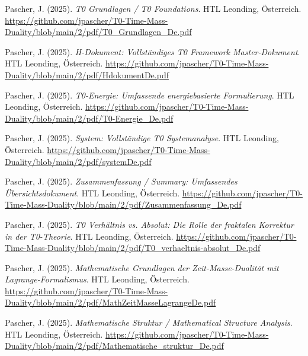\documentclass{article}
\begin{document}
	\begin{thebibliography}{99}
		
		
		Pascher, J. (2025).
		\textit{T0 Grundlagen / T0 Foundations}.
		HTL Leonding, Österreich.
		\url{https://github.com/jpascher/T0-Time-Mass-Duality/blob/main/2/pdf/T0_Grundlagen_De.pdf}
		
		Pascher, J. (2025).
		\textit{H-Dokument: Vollständiges T0 Framework Master-Dokument}.
		HTL Leonding, Österreich.
		\url{https://github.com/jpascher/T0-Time-Mass-Duality/blob/main/2/pdf/HdokumentDe.pdf}
		
		Pascher, J. (2025).
		\textit{T0-Energie: Umfassende energiebasierte Formulierung}.
		HTL Leonding, Österreich.
		\url{https://github.com/jpascher/T0-Time-Mass-Duality/blob/main/2/pdf/T0-Energie_De.pdf}
		
		Pascher, J. (2025).
		\textit{System: Vollständige T0 Systemanalyse}.
		HTL Leonding, Österreich.
		\url{https://github.com/jpascher/T0-Time-Mass-Duality/blob/main/2/pdf/systemDe.pdf}
		
		Pascher, J. (2025).
		\textit{Zusammenfassung / Summary: Umfassendes Übersichtsdokument}.
		HTL Leonding, Österreich.
		\url{https://github.com/jpascher/T0-Time-Mass-Duality/blob/main/2/pdf/Zusammenfassung_De.pdf}
		
		Pascher, J. (2025).
		\textit{T0 Verhältnis vs. Absolut: Die Rolle der fraktalen Korrektur in der T0-Theorie}.
		HTL Leonding, Österreich.
		\url{https://github.com/jpascher/T0-Time-Mass-Duality/blob/main/2/pdf/T0_verhaeltnis-absolut_De.pdf}
		
		
		
		Pascher, J. (2025).
		\textit{Mathematische Grundlagen der Zeit-Masse-Dualität mit Lagrange-Formalismus}.
		HTL Leonding, Österreich.
		\url{https://github.com/jpascher/T0-Time-Mass-Duality/blob/main/2/pdf/MathZeitMasseLagrangeDe.pdf}
		
		Pascher, J. (2025).
		\textit{Mathematische Struktur / Mathematical Structure Analysis}.
		HTL Leonding, Österreich.
		\url{https://github.com/jpascher/T0-Time-Mass-Duality/blob/main/2/pdf/Mathematische_struktur_De.pdf}
		

\end{thebibliography}
\end{document}
